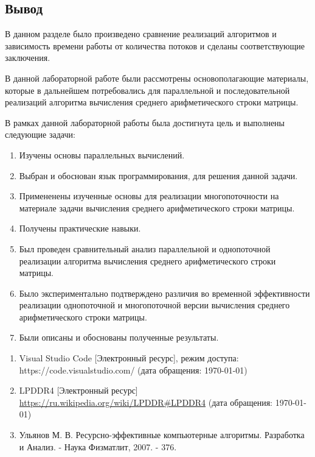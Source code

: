 \subsection{Вывод}

В данном разделе было произведено сравнение реализаций алгоритмов и зависимость времени работы от количества потоков и сделаны соответствующие заключения.


В данной лабораторной работе были рассмотрены основополагающие материалы, которые в дальнейшем потребовались для параллельной и последовательной реализаций алгоритма вычисления среднего арифметического строки матрицы. 

В рамках данной лабораторной работы была достигнута цель и выполнены следующие задачи:

\begin{enumerate}
	\item Изучены основы параллельных вычислений.
	\item Выбран и обоснован язык программирования, для решения данной задачи.
	\item Примененены изученные основы для реализации многопоточности на материале задачи вычисления среднего арифметического строки матрицы.
	\item Получены практические навыки.
	\item Был проведен сравнительный анализ параллельной и однопоточной реализации алгоритма вычисления среднего арифметического строки матрицы.
	\item Было экспериментально подтверждено различия во временной эффективности реализации однопоточной и многопоточной версии вычисления среднего арифметического строки матрицы.
	\item Были описаны и обоснованы полученные результаты.
\end{enumerate}


\begin{enumerate}
	\item Visual Studio Code [Электронный ресурс], режим доступа: https://code.visualstudio.com/ (дата обращения: \today)
	\item LPDDR4 [Электронный ресурс] \url{https://ru.wikipedia.org/wiki/LPDDR#LPDDR4} (дата обращения: \today)
	\item Ульянов М. В. Ресурсно-эффективные компьютерные алгоритмы. Разработка и Анализ. - Наука Физматлит, 2007. - 376.
\end{enumerate}


